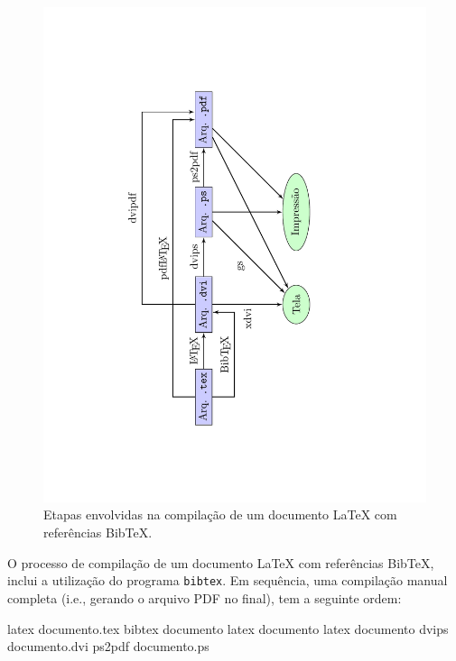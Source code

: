 \begin{figure}[H]
	\caption{Etapas envolvidas na compilação de um documento \LaTeX{} com referências Bib\TeX{}.}
	\vspace{6mm}
	\begin{center}
		\includegraphics[scale=0.6,angle=-90,trim={4.5cm 1cm 6cm 1cm},clip]{./docs/figs/diagramacompbib.pdf}
	\end{center}
	\vspace{4mm}
	\label{fig:compbibtex}
\end{figure}

O processo de compilação de um documento \LaTeX{} com referências Bib\TeX{}, inclui a utilização do programa {\tt bibtex}. Em sequência, uma compilação manual completa (i.e., gerando o arquivo PDF no final), tem a seguinte ordem:

\begin{meucomando}
latex documento.tex
bibtex documento
latex documento
latex documento
dvips documento.dvi
ps2pdf documento.ps
\end{meucomando}

